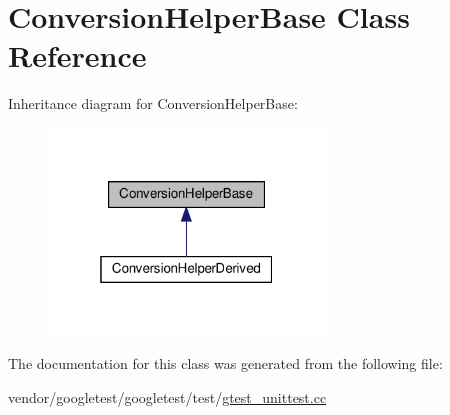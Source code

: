 \hypertarget{class_conversion_helper_base}{}\section{Conversion\+Helper\+Base Class Reference}
\label{class_conversion_helper_base}


Inheritance diagram for Conversion\+Helper\+Base\+:
\nopagebreak
\begin{figure}[H]
\begin{center}
\leavevmode
\includegraphics[width=208pt]{class_conversion_helper_base__inherit__graph}
\end{center}
\end{figure}


The documentation for this class was generated from the following file\+:\begin{DoxyCompactItemize}
\item 
vendor/googletest/googletest/test/\hyperlink{gtest__unittest_8cc}{gtest\+\_\+unittest.\+cc}\end{DoxyCompactItemize}

